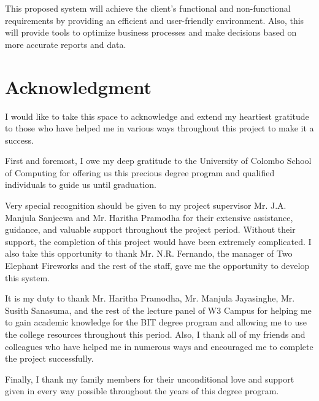 \documentclass[12pt]{report}
\begin{document}
This proposed system will achieve the client's functional and non-functional requirements by providing an efficient and user-friendly environment. Also, this will provide tools to optimize business processes and make decisions based on more accurate reports and data.

\newpage
\thispagestyle{plain}
\chapter*{\Huge Acknowledgment}
I would like to take this space to acknowledge and extend my heartiest gratitude to those who have helped me in various ways throughout this project to make it a success.

First and foremost, I owe my deep gratitude to the University of Colombo School of Computing for offering us this precious degree program and qualified individuals to guide us until graduation.

Very special recognition should be given to my project supervisor Mr. J.A. Manjula Sanjeewa and Mr. Haritha Pramodha for their extensive assistance, guidance, and valuable support throughout the project period. Without their support, the completion of this project would have been extremely complicated. I also take this opportunity to thank Mr. N.R. Fernando, the manager of Two Elephant Fireworks and the rest of the staff, gave me the opportunity to develop this system.

It is my duty to thank Mr. Haritha Pramodha, Mr. Manjula Jayasinghe, Mr. Susith Sanasuma, and the rest of the lecture panel of W3 Campus for helping me to gain academic knowledge for the BIT degree program and allowing me to use the college resources throughout this period. Also, I thank all of my friends and colleagues who have helped me in numerous ways and encouraged me to complete the project successfully.

Finally, I thank my family members for their unconditional love and support given in every way possible throughout the years of this degree program.


\newpage
{}
\begin{singlespacing}
	\tableofcontents
\end{singlespacing}
\setlength{\parskip}{1em}
\renewcommand{\baselinestretch}{2.0}


\newpage
{}
\begin{singlespacing}
	\listoffigures
\end{singlespacing}
\renewcommand{\baselinestretch}{2.0}
\end{document}
